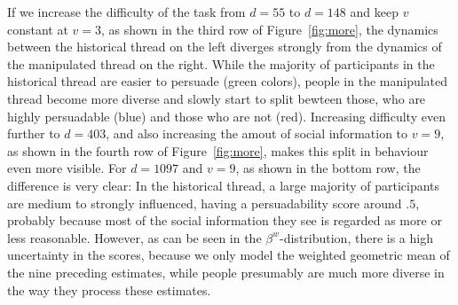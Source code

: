 \documentclass[9pt,a4paper,twocolumn,lineno]{article}
\begin{document}
If we increase the difficulty of the task from $d=55$ to $d=148$ and keep $v$ constant at $v=3$, as shown in the third row of Figure~\ref{fig:more}, the dynamics between the historical thread on the left diverges strongly from the dynamics of the manipulated thread on the right. While the majority of participants in the historical thread are easier to persuade (green colors), people in the manipulated thread become more diverse and slowly start to split bewteen those, who are highly persuadable (blue) and those who are not (red). Increasing difficulty even further to $d=403$, and also increasing the amout of social information to $v=9$, as shown in the fourth row of Figure~\ref{fig:more}, makes this split in behaviour even more visible. For $d=1097$ and $v=9$, as shown in the bottom row, the difference is very clear: In the historical thread, a large majority of participants are medium to strongly influenced, having a persuadability score around $.5$, probably because most of the social information they see is regarded as more or less reasonable. However, as can be seen in the $\beta^w$-distribution, there is a high uncertainty in the scores, because we only model the weighted geometric mean of the nine preceding estimates, while people presumably are much more diverse in the way they process these estimates. 



\end{document}
